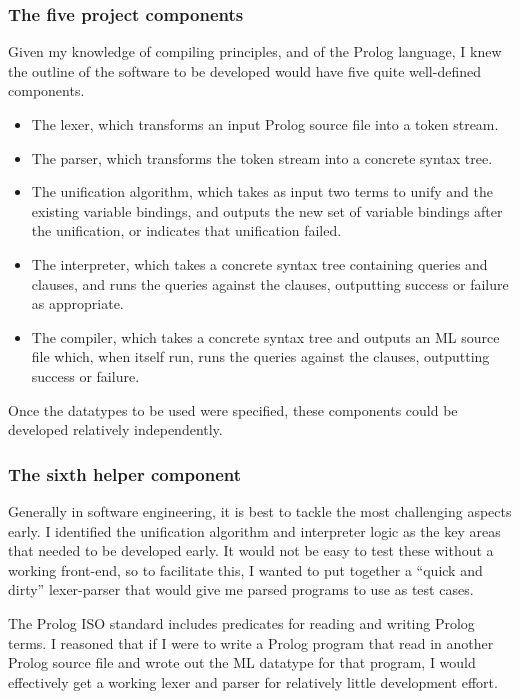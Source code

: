 \documentclass[12pt]{article}
\begin{document}
\subsubsection{The five project components}

Given my knowledge of compiling principles, and of the Prolog language, I knew the outline of the software to be developed would have five quite well-defined components.

\begin{itemize}
\item The lexer, which transforms an input Prolog source file into a token stream.
\item The parser, which transforms the token stream into a concrete syntax tree.
\item The unification algorithm, which takes as input two terms to unify and the existing variable bindings, and outputs the new set of variable bindings after the unification, or indicates that unification failed.
\item The interpreter, which takes a concrete syntax tree containing queries and clauses, and runs the queries against the clauses, outputting success or failure as appropriate.
\item The compiler, which takes a concrete syntax tree and outputs an ML source file which, when itself run, runs the queries against the clauses, outputting success or failure.
\end{itemize}

Once the datatypes to be used were specified, these components could be developed relatively independently.

\subsubsection{The sixth helper component}

Generally in software engineering, it is best to tackle the most challenging aspects early. 
I identified the unification algorithm and interpreter logic as the key areas that needed to be developed early. 
It would not be easy to test these without a working front-end, so to facilitate this, I wanted to put together a ``quick and dirty'' lexer-parser that would give me parsed programs to use as test cases.

The Prolog ISO standard includes predicates for reading and writing Prolog terms. 
I reasoned that if I were to write a Prolog program that read in another Prolog source file and wrote out the ML datatype for that program, I would effectively get a working lexer and parser for relatively little development effort. 
\end{document}
